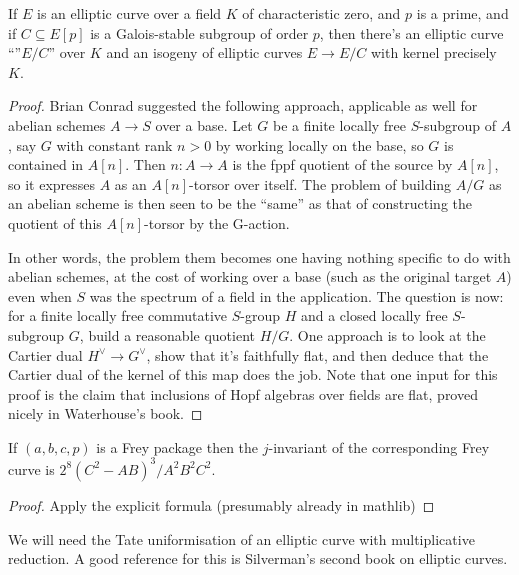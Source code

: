 \begin{theorem}\label{Elliptic_curve_quotient} If $E$ is an elliptic curve over a field $K$ of characteristic zero, and $p$ is a prime, and if $C\subseteq E[p]$ is a Galois-stable
  subgroup of order $p$, then there's an elliptic curve ``''$E/C$'' over $K$ and an isogeny of elliptic curves $E\to E/C$ with kernel precisely $K$.
\end{theorem}
\begin{proof}
  Brian Conrad suggested the following approach, applicable as well for abelian schemes $A\to S$ over a base.  Let $G$ be a finite locally free $S$-subgroup of $A$, say $G$ with constant rank $n > 0$ by working locally on the base, so $G$ is contained in $A[n]$.  Then $n: A \to A$ is the fppf quotient of the source by $A[n]$, so it expresses $A$ as an $A[n]$-torsor over itself.  The problem of building $A/G$ as an abelian scheme is then seen to be the “same” as that of constructing the quotient of this $A[n]$-torsor by the G-action.

  In other words, the problem them becomes one having nothing specific to do with abelian schemes, at the cost of working over a base (such as the original target $A$) even when $S$ was the spectrum of a field in the application. The question is now: for a finite locally free commutative $S$-group $H$ and a closed locally free $S$-subgroup $G$, build a reasonable quotient $H/G$. One approach is to look at the Cartier dual $H^\vee\to G^\vee$, show that it's faithfully flat, and then deduce that the Cartier dual of the kernel of this map does the job. Note that one input for this proof is the claim that inclusions of Hopf algebras over fields are flat, proved nicely in Waterhouse’s book.
\end{proof}
\begin{theorem}\label{Frey_curve_j} If $(a,b,c,p)$ is a Frey package then the $j$-invariant of the corresponding Frey curve is $2^8(C^2-AB)^3/A^2B^2C^2$.
\end{theorem}
\begin{proof}
  Apply the explicit formula (presumably already in mathlib)
\end{proof}

\begin{definition}\label{Tate_curve} We will need the Tate uniformisation of an elliptic curve with
  multiplicative reduction. A good reference for this is Silverman's second book on elliptic curves.
\end{definition}


